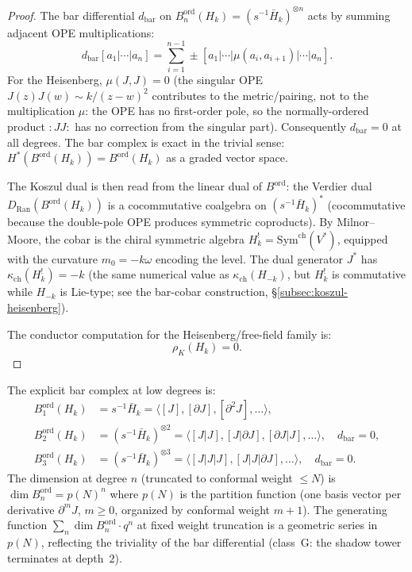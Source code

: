 \begin{proof}
The bar differential $d_{\mathrm{bar}}$ on
$B^{\mathrm{ord}}_n(H_k) = (s^{-1}\bar{H}_k)^{\otimes n}$ acts by
summing adjacent OPE multiplications:
\[
 d_{\mathrm{bar}}[a_1|\cdots|a_n] = \sum_{i=1}^{n-1} \pm
 [a_1|\cdots|\mu(a_i, a_{i+1})|\cdots|a_n].
\]
For the Heisenberg, $\mu(J, J) = 0$ (the singular OPE $J(z)J(w) \sim
k/(z-w)^2$ contributes to the metric/pairing, not to the multiplication
$\mu$: the OPE has no first-order pole, so the normally-ordered product
$:JJ:$ has no correction from the singular part). Consequently
$d_{\mathrm{bar}} = 0$ at all degrees. The bar complex is exact in the
trivial sense: $H^*(B^{\mathrm{ord}}(H_k)) = B^{\mathrm{ord}}(H_k)$ as
a graded vector space.

The Koszul dual is then read from the linear dual of $B^{\mathrm{ord}}$:
the Verdier dual $D_{\mathrm{Ran}}(B^{\mathrm{ord}}(H_k))$ is a
cocommutative coalgebra on $(s^{-1}\bar{H}_k)^*$ (cocommutative because
the double-pole OPE produces symmetric coproducts). By Milnor--Moore,
the cobar is the chiral symmetric algebra
$H_k^! = \mathrm{Sym}^{\mathrm{ch}}(V^*)$, equipped with the curvature
$m_0 = -k\omega$ encoding the level. The dual generator $J^*$ has
$\kappa_{\mathrm{ch}}(H_k^!) = -k$ (the same numerical value as
$\kappa_{\mathrm{ch}}(H_{-k})$, but $H_k^!$ is commutative while
$H_{-k}$ is Lie-type; see the bar-cobar construction, \S\ref{subsec:koszul-heisenberg}).

The conductor computation for the Heisenberg/free-field family is:
\[
 \rho_K(H_k) = 0.
\]
\end{proof}

The explicit bar complex at low degrees is:
\begin{align}
 B^{\mathrm{ord}}_1(H_k) &= s^{-1}\bar{H}_k =
 \langle [J], [\partial J], [\partial^2 J], \ldots \rangle,
 \label{eq:heisenberg-bar-1} \\
 B^{\mathrm{ord}}_2(H_k) &= (s^{-1}\bar{H}_k)^{\otimes 2} =
 \langle [J|J], [J|\partial J], [\partial J|J], \ldots \rangle,
 \quad d_{\mathrm{bar}} = 0,
 \label{eq:heisenberg-bar-2} \\
 B^{\mathrm{ord}}_3(H_k) &= (s^{-1}\bar{H}_k)^{\otimes 3} =
 \langle [J|J|J], [J|J|\partial J], \ldots \rangle,
 \quad d_{\mathrm{bar}} = 0.
 \label{eq:heisenberg-bar-3}
\end{align}
The dimension at degree $n$ (truncated to conformal weight $\leq N$)
is $\dim B^{\mathrm{ord}}_n = p(N)^n$ where $p(N)$ is the partition
function (one basis vector per derivative $\partial^m J$, $m \geq 0$,
organized by conformal weight $m+1$). The generating function
$\sum_n \dim B^{\mathrm{ord}}_n \cdot q^n$ at fixed weight truncation
is a geometric series in $p(N)$, reflecting the triviality of the bar
differential (class~G: the shadow tower terminates at depth~$2$).

